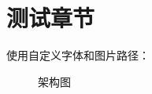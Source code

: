 \documentclass{document}
\begin{document}
\section{测试章节}
使用自定义字体和图片路径：
\begin{figure}[htbp]
  \centering
  \caption{架构图}
\end{figure}

\printbibliography
\end{document}
